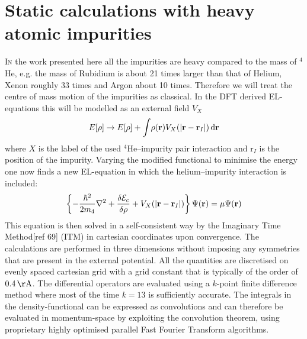 \documentclass[12pt,a4paper,twosides]{book}
\renewcommand{\vec}[1]{\bm{\mathrm{#1}}}
\newcommand{\unit}[1]{\,\mathrm{#1}}
\newcommand{\diff}[1]{\,\mathrm{d}{\vec{#1}}}
\begin{document}
	\section{Static calculations with heavy atomic impurities}
		\lettrine[lines=3,findent=3pt,nindent=0pt]{I}{n} the work presented here all the impurities are heavy compared to the mass of $^4$He, e.g. the mass of Rubidium is about 21 times larger than that of Helium, Xenon roughly 33 times and Argon about 10 times. Therefore we will treat the centre of mass motion of the impurities as classical. In the DFT derived EL-equations this will be modelled as an external field $V_X$
		\begin{align}
			E[\rho] \rightarrow E[\rho] +  \int\!\rho({\mathbf r}) V_X\qty(\abs{{\mathbf r} - {\mathbf r}_I})\diff{r} \label{eq:el-static-hi}
		\end{align}
		where $X$ is the label of the used $^4$He--impurity pair interaction and ${\vec r}_I$ is the position of the impurity. Varying the modified functional to minimise the energy one now finds a new EL-equation in which the helium--impurity interaction is included:
		\begin{align}
			\left\{-\frac{\hbar^2}{2m_4} \laplacian + \fdv{\mathcal{E}_c}{\rho} + V_X(|{\mathbf r} - {\mathbf r_I}|)\right\}\Psi({\mathbf r}) = \mu \Psi({\mathbf r}) \label{eq:el-static-hi}
		\end{align}
		This equation is then solved in a self-consistent way by the Imaginary Time Method[ref 69] (ITM) in cartesian coordinates upon convergence. The calculations are performed in three dimensions without imposing any symmetries that are present in the external potential. All the quantities are discretised on evenly spaced cartesian grid with a grid constant that is typically of the order of $0.4\unit{\AA}$. The differential operators are evaluated using a $k$-point finite difference method where most of the time $k=13$ is sufficiently accurate. The integrals in the density-functional can be expressed as convolutions and can therefore be evaluated in momentum-space by exploiting the convolution theorem, using proprietary highly optimised parallel Fast Fourier Transform algorithms. 
			
\end{document}
